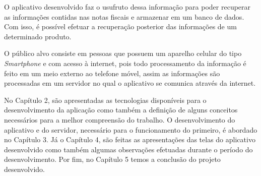 O aplicativo desenvolvido faz o usufruto dessa informação para poder recuperar as informações contidas nas notas fiscais e armazenar em um banco de dados. Com isso, é possível efetuar a recuperação posterior das informações de um determinado produto.


O público alvo consiste em pessoas que possuem um aparelho celular do tipo \textit{Smartphone} e com acesso à internet, pois todo processamento da informação é feito em um meio externo ao telefone móvel, assim as informações são processadas em um servidor no qual o aplicativo se comunica através da internet.

No Capítulo 2, são apresentadas as tecnologias disponíveis para o desenvolvimento da aplicação como também a definição de alguns conceitos necessários para a melhor compreensão do trabalho. O desenvolvimento do aplicativo e do servidor, necessário para o funcionamento do primeiro, é abordado no Capítulo 3. Já o Capítulo 4, são feitas as apresentações das telas do aplicativo desenvolvido como também algumas observações efetuadas durante o período do desenvolvimento. Por fim, no Capítulo 5 temos a conclusão do projeto desenvolvido.
